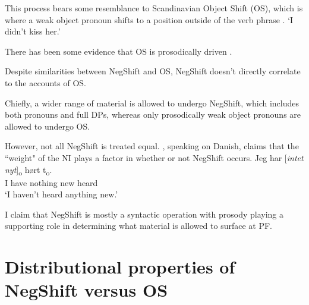 \documentclass[12pt, letterpaper]{article}
\begin{document}
\ex This process bears some resemblance to Scandinavian Object Shift (OS), which is where a weak object pronoun shifts to a position outside of the verb phrase \citep{holmbergWordOrderSyntactic1986,holmbergRemarksHolmbergGeneralization1999}.
	 
	\glt `I didn't kiss her.'
	\z 

\ex There has been some evidence that OS is prosodically driven \citep{erteschik-shirSoundPatternsSyntax2005,erteschik-shirScandinavianObjectShift2017,erteschik-shirVariationMainlandScandinavian2020,brinkerhoffMATCHINGPhrasesNorwegian2021}. 

\ex Despite similarities between NegShift and OS, NegShift doesn't directly correlate to the accounts of OS. 

\ex Chiefly, a wider range of material is allowed to undergo NegShift, which includes both pronouns and full DPs, whereas only prosodically weak object pronouns are allowed to undergo OS.

\ex However, not all NegShift is treated equal. \citet[65f]{christensenInterfacesNegationSyntax2005}, speaking on Danish, claims that the ``weight" of the NI plays a factor in whether or not NegShift occurs. 
	\ea
	\gll Jeg har [\textit{intet} \textit{nyt}]\textsubscript{o} hørt t\textsubscript{o}.\\
	I have nothing new heard\\
	\glt `I haven't heard anything new.'
	\z

\begin{tcolorbox}[width=\linewidth]
\centering
I claim that NegShift is mostly a syntactic operation with prosody playing a supporting role in determining what material is allowed to surface at PF. 
\end{tcolorbox}	
\z 

\section{Distributional properties of NegShift versus OS} \label{sec:ENGELS}
\end{document}
